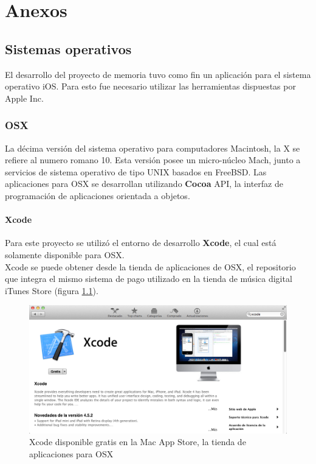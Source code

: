 \chapter{Anexos}
	\section{Sistemas operativos}
	El desarrollo del proyecto de memoria tuvo como fin un aplicación para el sistema operativo iOS. Para esto fue necesario utilizar las herramientas dispuestas por Apple Inc.
		\subsection{OSX}
La décima versión del sistema operativo para computadores Macintosh, la X se refiere al numero romano 10. Esta versión posee un micro-núcleo Mach, junto a servicios de sistema operativo de tipo UNIX basados en FreeBSD.
Las aplicaciones para OSX se desarrollan utilizando \textbf{Cocoa} API, la interfaz de programación de aplicaciones orientada a objetos.
\subsubsection{Xcode}
Para este proyecto se utilizó el entorno de desarrollo \textbf{Xcode}, el cual está solamente disponible para OSX.\\

Xcode se puede obtener desde la tienda de aplicaciones de OSX, el repositorio que integra el mismo sistema de pago utilizado en la tienda de música digital iTunes Store (figura \ref{fig:xcode-appstore}).
\begin{figure}[H]
	\centering
	\includegraphics[scale=0.41]{imgs/xcode-appstore.png} 
	\caption{Xcode disponible gratis en la Mac App Store, la tienda de aplicaciones para OSX}
	\label{fig:xcode-appstore}
\end{figure}  
